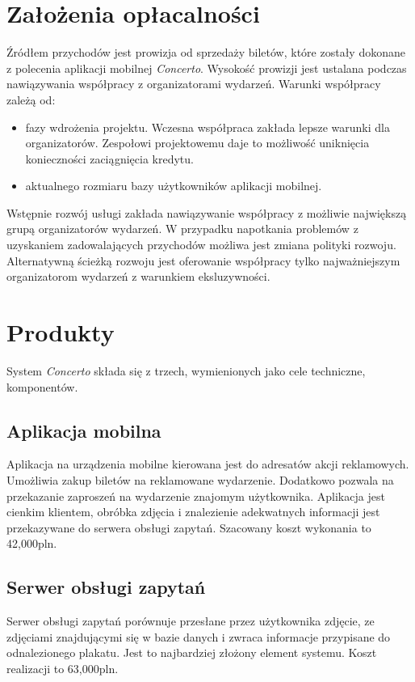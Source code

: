 \documentclass[10pt]{dokument-ppi}
\begin{document}
\section{Założenia opłacalności}

Źródłem przychodów jest prowizja od sprzedaży biletów, które zostały dokonane z
polecenia aplikacji mobilnej \emph{Concerto}. Wysokość prowizji jest ustalana
podczas nawiązywania współpracy z organizatorami wydarzeń. Warunki współpracy
zależą od:
\begin{itemize}
    \item fazy wdrożenia projektu. Wczesna współpraca zakłada lepsze warunki
        dla organizatorów. Zespołowi projektowemu daje to możliwość uniknięcia
        konieczności zaciągnięcia kredytu.
    \item aktualnego rozmiaru bazy użytkowników aplikacji mobilnej.
\end{itemize}
Wstępnie rozwój usługi zakłada nawiązywanie współpracy z możliwie największą
grupą organizatorów wydarzeń. W przypadku napotkania problemów z uzyskaniem
zadowalających przychodów możliwa jest zmiana polityki rozwoju. Alternatywną
ścieżką rozwoju jest oferowanie współpracy tylko najważniejszym organizatorom
wydarzeń z warunkiem eksluzywności.


\section{Produkty}
\label{sec:produkty}
System \emph{Concerto} składa się z trzech, wymienionych jako cele techniczne,
komponentów.

\subsection{Aplikacja mobilna}
Aplikacja na urządzenia mobilne kierowana jest do adresatów akcji reklamowych.
Umożliwia zakup biletów na reklamowane wydarzenie. Dodatkowo pozwala na
przekazanie zaproszeń na wydarzenie znajomym użytkownika. Aplikacja jest cienkim
klientem, obróbka zdjęcia i znalezienie adekwatnych informacji jest przekazywane
do serwera obsługi zapytań. Szacowany koszt wykonania to 42,000pln.

\subsection{Serwer obsługi zapytań}
Serwer obsługi zapytań porównuje przesłane przez użytkownika zdjęcie, ze
zdjęciami znajdującymi się w bazie danych i zwraca informacje przypisane do
odnalezionego plakatu. Jest to najbardziej złożony element systemu.
Koszt realizacji to 63,000pln.
\end{document}
